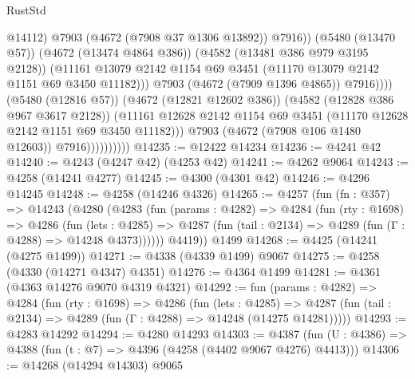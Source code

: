 \begin{lexlean}{RustStd}
\begin{coremodule}
                                          @14112)
                                        @7903
                                        (@4672 (@7908 @37 @1306 @13892))
                                        @7916))
                                    (@5480 (@13470 @57))
                                    (@4672 (@13474 @4864 @386))
                                    (@4582 (@13481 @386 @979 @3195 @2128))
                                    (@11161
                                      @13079
                                      @2142
                                      @1154
                                      @69
                                      @3451
                                      (@11170 @13079 @2142 @1151 @69 @3450 @11182)))
                                  @7903
                                  (@4672 (@7909 @1396 @4865))
                                  @7916))))
                          (@5480 (@12816 @57))
                          (@4672 (@12821 @12602 @386))
                          (@4582 (@12828 @386 @967 @3617 @2128))
                          (@11161
                            @12628
                            @2142
                            @1154
                            @69
                            @3451
                            (@11170 @12628 @2142 @1151 @69 @3450 @11182)))
                        @7903
                        (@4672 (@7908 @106 @1480 @12603))
                        @7916))))))))))
@14235 := @12422 @14234
@14236 := @4241 @42
@14240 := @4243 (@4247 @42) (@4253 @42)
@14241 := @4262 @9064
@14243 := @4258 (@14241 @4277)
@14245 := @4300 (@4301 @42)
@14246 := @4296 @14245
@14248 := @4258 (@14246 @4326)
@14265 := @4257
    (fun (fn : @357) =>
    @14243
      (@4280
        (@4283
          (fun (params : @4282) =>
          @4284
            (fun (rty : @1698) =>
            @4286
              (fun (lets : @4285) =>
              @4287 (fun (tail : @2134) => @4289 (fun (Γ : @4288) => @14248 @4373))))))
        @4419))
    @1499
@14268 := @4425 (@14241 (@4275 @1499))
@14271 := @4338 (@4339 @1499) @9067
@14275 := @4258 (@4330 (@14271 @4347) @4351)
@14276 := @4364 @1499
@14281 := @4361 (@4363 @14276 @9070 @4319 @4321)
@14292 := fun (params : @4282) =>
  @4284
    (fun (rty : @1698) =>
    @4286
      (fun (lets : @4285) =>
      @4287 (fun (tail : @2134) => @4289 (fun (Γ : @4288) => @14248 (@14275 @14281)))))
@14293 := @4283 @14292
@14294 := @4280 @14293
@14303 := @4387 (fun (U : @4386) => @4388 (fun (t : @7) => @4396 (@4258 (@4402 @9067 @4276) @4413)))
@14306 := @14268 (@14294 @14303) @9065

\end{coremodule}
\end{lexlean}
